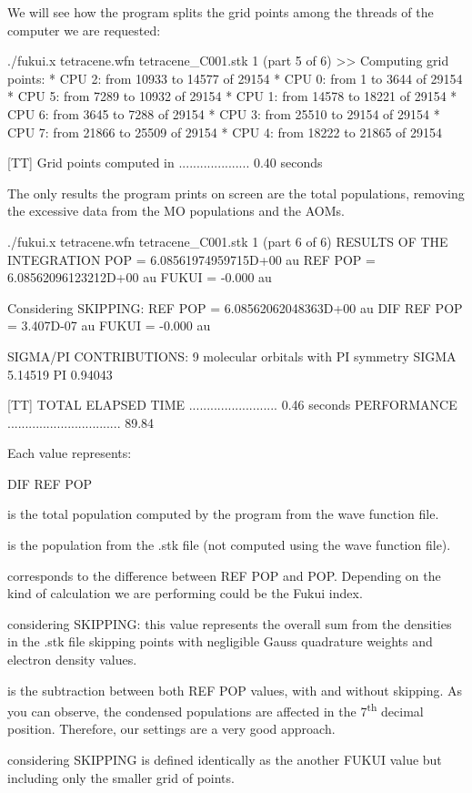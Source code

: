 \documentclass[a4paper,11pt,openany]{memoir}
\begin{document}
We will see how the program splits the grid points among the threads of the computer we are requested:
\begin{consola}{./fukui.x tetracene.wfn tetracene\_C001.stk 1 (part 5 of 6)}
>> Computing grid points:
* CPU 2: from 10933 to 14577 of 29154
* CPU 0: from 1 to 3644 of 29154
* CPU 5: from 7289 to 10932 of 29154
* CPU 1: from 14578 to 18221 of 29154
* CPU 6: from 3645 to 7288 of 29154
* CPU 3: from 25510 to 29154 of 29154
* CPU 7: from 21866 to 25509 of 29154
* CPU 4: from 18222 to 21865 of 29154

[TT] Grid points computed in .................... 0.40 seconds
\end{consola}
The only results the program prints on screen are the total populations, removing the excessive data from the \ac{MO} populations and the \acp{AOM}.
\begin{consola}{./fukui.x tetracene.wfn tetracene\_C001.stk 1 (part 6 of 6)}
RESULTS OF THE INTEGRATION
POP =         6.08561974959715D+00 au
REF POP =     6.08562096123212D+00 au
FUKUI = -0.000 au

Considering SKIPPING:
REF POP =     6.08562062048363D+00 au
DIF REF POP = 3.407D-07 au
FUKUI = -0.000 au

SIGMA/PI CONTRIBUTIONS:     9 molecular orbitals with PI symmetry
SIGMA   5.14519     PI   0.94043

[TT] TOTAL ELAPSED TIME ......................... 0.46 seconds
PERFORMANCE ................................ 89.84%
\end{consola}
Each value represents:
\begin{labeling}{DIF REF POP}
	\item[POP] is the total population computed by the program from the wave function file.
	\item[REF POP] is the population from the .stk file (not computed using the wave function file).
	\item[FUKUI] corresponds to the difference between REF POP and POP. Depending on the kind of calculation we are performing could be the Fukui index.
	\item[REF POP] considering SKIPPING: this value represents the overall sum from the densities in the .stk file skipping points with negligible Gauss quadrature weights and electron density values.
	\item[DIF REF POP] is the subtraction between both REF POP values, with and without skipping. As you can observe, the condensed populations are affected in the 7\textsuperscript{th} decimal position. Therefore, our settings are a very good approach.
	\item[FUKUI] considering SKIPPING is defined identically as the another FUKUI value but including only the smaller grid of points.
\end{labeling}
\end{document}

